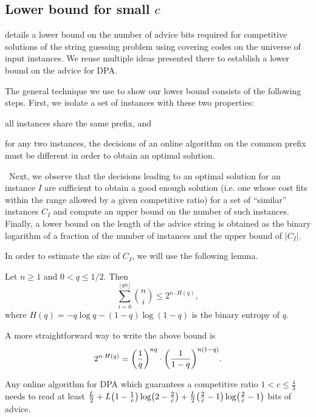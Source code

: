 \subsection{Lower bound for small $c$}

\cite{string-guessing} details a lower bound on the number of advice bits
required for competitive solutions of the string guessing problem using
covering codes on the universe of input instances. We reuse multiple ideas
presented there to establish a lower bound on the advice for DPA.

The general technique we use to show our lower bound consists of the
following steps. First, we isolate a set of instances with these two
properties: \begin{inparaenum}\item all instances share the same prefix,
and \item for any two instances, the decisions of an online algorithm on
the common prefix must be different in order to obtain an optimal
solution.\end{inparaenum}\ Next, we observe that the decisions leading to
an optimal solution for an instance $I$ are sufficient to obtain a good
enough solution (i.e. one whose cost fits within the range allowed by a
given competitive ratio) for a set of ``similar'' instances $C_I$ and
compute an upper bound on the number of such instances. Finally, a lower
bound on the length of the advice string is obtained as the binary
logarithm of a fraction of the number of instances and the upper bound of
$|C_I|$.

In order to estimate the size of $C_I$, we will use the following lemma.

\begin{lemma}\label{lemma:hamming}
    Let $n \geq 1$ and $0 < q \leq 1/2$. Then
    $$
        \sum_{i=0}^{\lfloor{}qn\rfloor} \binom{n}{i} \leq
        2^{n\cdot{}H(q)},
    $$
    where $H(q) = -q \log q - (1-q) \log (1-q)$ is the binary entropy of
    $q$.
\end{lemma}

A more straightforward way to write the above bound is
$$
    2^{n\cdot{}H(q)} = \paren*{\frac{1}{q}}^{nq} \cdot
    \paren*{\frac{1}{1-q}}^{n(1-q)}.
$$


\begin{theorem}
    Any online algorithm for DPA which guarantees a competitive ratio $1 <
    c \leq \frac{4}{3}$ needs to read at least $\frac{L}{2} +
    L\paren*{1-\frac{1}{c}}\log\paren*{2-\frac{2}{c}} +
    \frac{L}{2}\paren*{\frac{2}{c}-1}\log\paren*{\frac{2}{c}-1}$ bits of
    advice.
\end{theorem}

